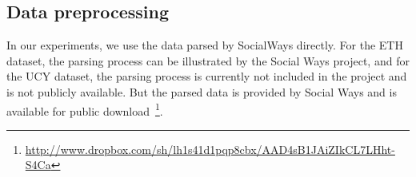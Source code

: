 \subsection{Data preprocessing}

In our experiments, we use the data parsed by SocialWays directly. For the ETH dataset, the parsing process can be illustrated by the Social Ways project, and for the UCY dataset, the parsing process is currently not included in the project and is not publicly available. But the parsed data is provided by Social Ways and is available for public download~\footnote{\url{http://www.dropbox.com/sh/lh1s41d1pqp8cbx/AAD4sB1JAiZIkCL7LHht-S4Ca}}.